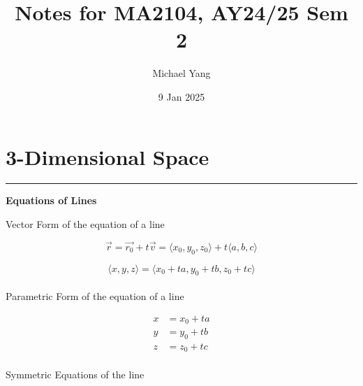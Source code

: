 \documentclass[11pt]{article}
\begin{document}
\title{Notes for MA2104, AY24/25 Sem 2}
\author{Michael Yang}
\date{9 Jan 2025}
\maketitle


\newcommand{\R}[1]{\mbox{$\mathbb{R}^{#1}$}}  %
\newcommand{\Bf}[1]{\mathbf{#1}}
\newcommand{\Bb}[1]{\mathbb{#1}}
\newcommand{\q}{\quad}
\newcommand{\qq}{\qquad}
\newcommand{\br}{\\\;\\}

\newcommand{\sectiontitle}[1]{%
\begin{flushleft}\large{\textbf{#1}}\end{flushleft}} 

\newcommand{\chapter}[1]{%
\newpage
\section*{#1}
\hrule
\vspace{0.3cm}
}

\newcommand{\vv}[1]{%
\langle 
{#1}
\rangle
}


\chapter{3-Dimensional Space}

\sectiontitle{Equations of Lines}

Vector Form of the equation of a line

\[ \vec{r}=\vec{r_{0}}+t\vec{v}=\vv{x_{0},y_{0},z_{0}}+t\vv{a,b,c} \] 

\[ \vv{x,y,z}=\vv{x_{0}+ta,y_{0}+tb,z_{0}+tc} \] \\

Parametric Form of the equation of a line

\begin{align*}
x&=x_{0}+ta \\
y&=y_{0}+tb \\
z&=z_{0}+tc \\
\end{align*}

Symmetric Equations of the line
\end{document}
